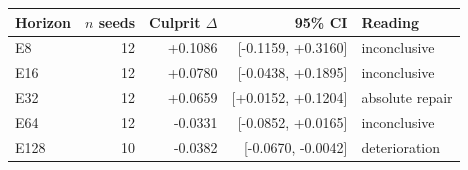\begin{tabular}{lrrrl}
\toprule
Horizon & $n$ seeds & Culprit $\Delta$ & 95\% CI & Reading \\
\midrule
E8 & 12 & +0.1086 & [-0.1159, +0.3160] & inconclusive \\
E16 & 12 & +0.0780 & [-0.0438, +0.1895] & inconclusive \\
E32 & 12 & +0.0659 & [+0.0152, +0.1204] & absolute repair \\
E64 & 12 & -0.0331 & [-0.0852, +0.0165] & inconclusive \\
E128 & 10 & -0.0382 & [-0.0670, -0.0042] & deterioration \\
\bottomrule
\end{tabular}